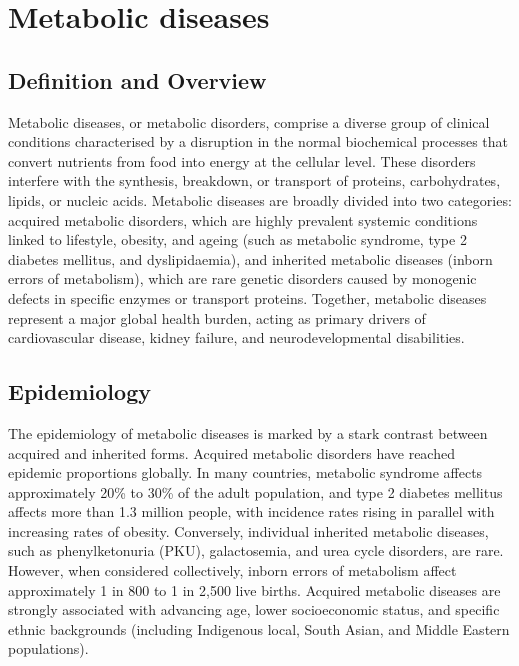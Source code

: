\chapter{Metabolic diseases}

\section*{Definition and Overview}
Metabolic diseases, or metabolic disorders, comprise a diverse group of clinical conditions characterised by a disruption in the normal biochemical processes that convert nutrients from food into energy at the cellular level. These disorders interfere with the synthesis, breakdown, or transport of proteins, carbohydrates, lipids, or nucleic acids. Metabolic diseases are broadly divided into two categories: acquired metabolic disorders, which are highly prevalent systemic conditions linked to lifestyle, obesity, and ageing (such as metabolic syndrome, type 2 diabetes mellitus, and dyslipidaemia), and inherited metabolic diseases (inborn errors of metabolism), which are rare genetic disorders caused by monogenic defects in specific enzymes or transport proteins. Together, metabolic diseases represent a major global health burden, acting as primary drivers of cardiovascular disease, kidney failure, and neurodevelopmental disabilities.

\section*{Epidemiology}
The epidemiology of metabolic diseases is marked by a stark contrast between acquired and inherited forms. Acquired metabolic disorders have reached epidemic proportions globally. In many countries, metabolic syndrome affects approximately 20\% to 30\% of the adult population, and type 2 diabetes mellitus affects more than 1.3 million people, with incidence rates rising in parallel with increasing rates of obesity. Conversely, individual inherited metabolic diseases, such as phenylketonuria (PKU), galactosemia, and urea cycle disorders, are rare. However, when considered collectively, inborn errors of metabolism affect approximately 1 in 800 to 1 in 2,500 live births. Acquired metabolic diseases are strongly associated with advancing age, lower socioeconomic status, and specific ethnic backgrounds (including Indigenous local, South Asian, and Middle Eastern populations).

